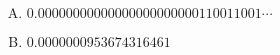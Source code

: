 {{        %
        \begin{practicec}
            \begin{enumerate}[A.]
                \item $0.0000 0000 0000 0000 0000 0001 1001 1001\cdots$
                \item $0.0000000953674316461$
            \end{enumerate}
        \end{practicec}
    }
}
